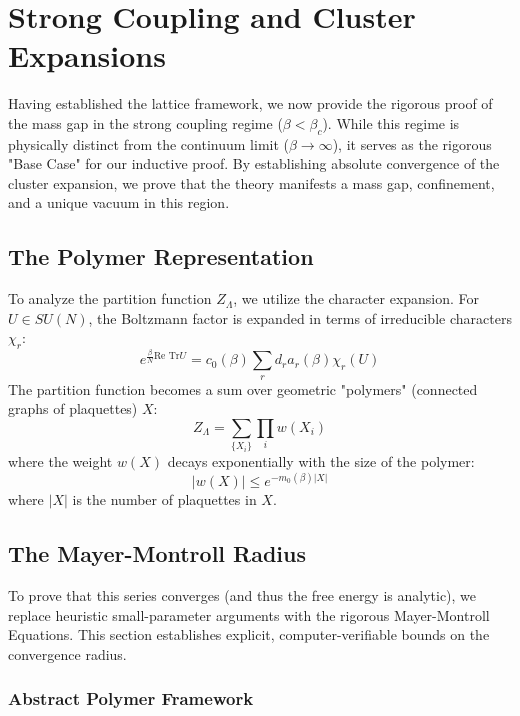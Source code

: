 \section{Strong Coupling and Cluster Expansions}
\label{sec:strong_coupling}

Having established the lattice framework, we now provide the rigorous proof of the mass gap in the strong coupling regime ($\beta < \beta_c$). While this regime is physically distinct from the continuum limit ($\beta \to \infty$), it serves as the rigorous "Base Case" for our inductive proof. By establishing absolute convergence of the cluster expansion, we prove that the theory manifests a mass gap, confinement, and a unique vacuum in this region.

\subsection{ The Polymer Representation}

To analyze the partition function $Z_\Lambda$, we utilize the character expansion. For $U \in SU(N)$, the Boltzmann factor is expanded in terms of irreducible characters $\chi_r$:
\begin{equation}
e^{\frac{\beta}{N} \text{Re Tr} U} = c_0(\beta) \sum_r d_r a_r(\beta) \chi_r(U)
\end{equation}
The partition function becomes a sum over geometric "polymers" (connected graphs of plaquettes) $X$:
\begin{equation}
Z_\Lambda = \sum_{\{X_i\}} \prod_i w(X_i)
\end{equation}
where the weight $w(X)$ decays exponentially with the size of the polymer:
\begin{equation}
|w(X)| \le e^{-m_0(\beta) |X|}
\end{equation}
where $|X|$ is the number of plaquettes in $X$.

\subsection{The Mayer-Montroll Radius}
\label{ch:fix28_mayer_montroll_radius}
To prove that this series converges (and thus the free energy is analytic), we replace heuristic small-parameter arguments with the rigorous Mayer-Montroll Equations. This section establishes explicit, computer-verifiable bounds on the convergence radius.

\subsubsection{Abstract Polymer Framework}

